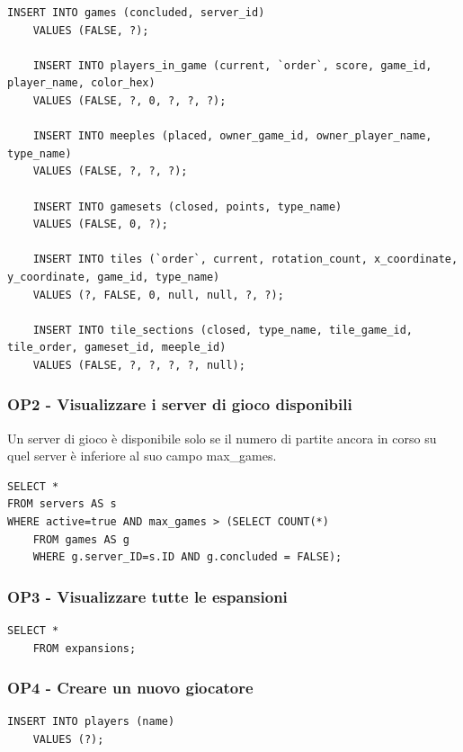 \begin{lstlisting}[style=sql]
    INSERT INTO games (concluded, server_id)
    VALUES (FALSE, ?);

    INSERT INTO players_in_game (current, `order`, score, game_id, player_name, color_hex)
    VALUES (FALSE, ?, 0, ?, ?, ?);

    INSERT INTO meeples (placed, owner_game_id, owner_player_name, type_name)
    VALUES (FALSE, ?, ?, ?);

    INSERT INTO gamesets (closed, points, type_name)
    VALUES (FALSE, 0, ?);

    INSERT INTO tiles (`order`, current, rotation_count, x_coordinate, y_coordinate, game_id, type_name)
    VALUES (?, FALSE, 0, null, null, ?, ?);

    INSERT INTO tile_sections (closed, type_name, tile_game_id, tile_order, gameset_id, meeple_id)
    VALUES (FALSE, ?, ?, ?, ?, null);
\end{lstlisting}

\subsubsection*{OP2 - Visualizzare i server di gioco disponibili}
Un server di gioco è disponibile solo se il numero di partite ancora in corso su quel server è inferiore al suo campo max\_games.
\medskip

\begin{lstlisting}[style=sql]
SELECT *
FROM servers AS s
WHERE active=true AND max_games > (SELECT COUNT(*)
    FROM games AS g
    WHERE g.server_ID=s.ID AND g.concluded = FALSE);
\end{lstlisting}

\subsubsection*{OP3 - Visualizzare tutte le espansioni}
\begin{lstlisting}[style=sql]
    SELECT *
    FROM expansions;
\end{lstlisting}

\subsubsection*{OP4 - Creare un nuovo giocatore}
\begin{lstlisting}[style=sql]
    INSERT INTO players (name)
    VALUES (?);
\end{lstlisting}


